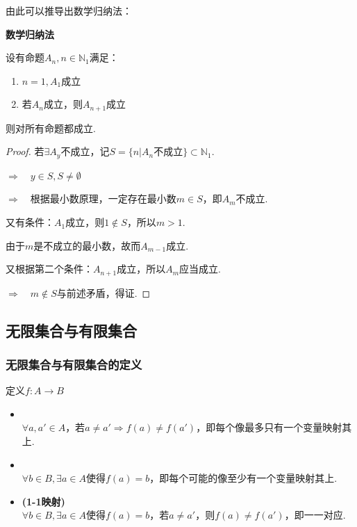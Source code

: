 由此可以推导出数学归纳法：
\begin{theorem}
    \textbf{数学归纳法}

    设有命题$A_n, n \in \mathbb{N}_1$满足：
    \begin{enumerate}[circ]
        \item $n=1,A_1$成立
        \item 若$A_n$成立，则$A_{n+1}$成立
    \end{enumerate}
    则对所有命题都成立.
\end{theorem}
\begin{proof}
    若$\exists A_y$不成立，记$S = \{n | A_n \text{不成立}\} \subset \mathbb{N}_1$.

    $\Rightarrow\quad y \in S, S \neq \emptyset$
    
    $\Rightarrow\quad$根据最小数原理，一定存在最小数$m \in S$，即$A_m$不成立.

    又有条件：$A_1$成立，则$1 \notin S$，所以$m > 1$.

    由于$m$是不成立的最小数，故而$A_{m-1}$成立.
    
    又根据第二个条件：$A_{n+1}$成立，所以$A_m$应当成立.

    $\Rightarrow\quad m \notin S$与前述矛盾，得证.
\end{proof}


\subsection{无限集合与有限集合}
\subsubsection{无限集合与有限集合的定义}
\begin{definition}

    定义$f:A \to B$
    \begin{itemize}
        \item {}\\
        $\forall a,a' \in A$，若$a \neq a' \Rightarrow f(a) \neq f(a')$，即每个像最多只有一个变量映射其上.
        \item {}\\
        $\forall b \in B, \exists a \in A$使得$f(a) = b$，即每个可能的像至少有一个变量映射其上.
        \item {} \textbf{(1-1映射)}\\
        $\forall b \in B, \exists a \in A$使得$f(a) = b$，若$a \neq a'$，则$f(a) \neq f(a')$，即一一对应.
        
    \end{itemize}
\end{definition}

